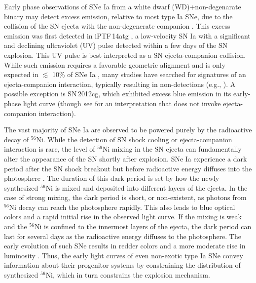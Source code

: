 \documentclass[twocolumn]{aastex61}
\newcommand{\ycao}[1]{{\color{red} ycao: {#1}}}
\begin{document}
Early phase observations of SNe Ia from a white dwarf (WD)$+$non-degenarate binary
may detect excess emission, relative to most type Ia SNe, due to the 
collision of the SN ejecta with the non-degenerate companion 
\citep{1973ApJ...186.1007W,2010ApJ...708.1025K}. This excess 
emission was first detected in iPTF\,14atg  \citep{2015Natur.521..328C}, a low-velocity SN Ia with a significant and declining ultraviolet (UV) pulse detected within a
few days of the SN explosion. This UV pulse is best interpreted as a
SN ejecta-companion collision. While such emission requires a 
favorable geometric alignment and is only expected in $\lesssim$ 
10\% of SNe Ia \citep{2010ApJ...708.1025K}, many studies have 
searched for signatures of an ejecta-companion interaction, 
typically resulting in non-detections 
(e.g., \citealt{2010ApJ...722.1691H,2011ApJ...741...20B,2012ApJ...744...38F,
  2012ApJ...744L..17B,2015Natur.521..332O,
  2013ApJ...778L..15Z,2015ApJ...799..106G,2016ApJ...826..144S,
  2015ApJS..221...22I}). A possible exception is SN\,2012cg, 
which exhibited excess blue emission in its early-phase light curve 
\citet{2016ApJ...820...92M} (though see 
\citealt{2016arXiv161007601S} for an interpretation that does not 
invoke ejecta-companion interaction). 

The vast majority of SNe Ia are observed 
to be powered purely by the radioactive decay of $^{56}$Ni. 
While the detection of SN shock cooling or ejecta-companion interaction is rare, the level of $^{56}$Ni mixing in the SN ejecta can fundamentally alter the appearance of the SN shortly after explosion. SNe Ia experience a dark period after
the SN shock breakout but before radioactive energy  
diffuses into the photosphere \citep{2014ApJ...784...85P}. The 
duration of this dark period is set by how the newly synthesized 
$^{56}$Ni is mixed and deposited into different layers of the ejecta.
In the case of strong mixing, the dark period is short, or 
non-existent, as photons from $^{56}$Ni decay can reach the 
photosphere rapidly. This also leads to blue optical colors and a 
rapid initial rise in the observed light curve. If the mixing is 
weak and the $^{56}$Ni is confined to the innermost layers of the 
ejecta, the dark period can last for several days as the radioactive 
energy diffuses to the photosphere. The early evolution of such SNe 
results in redder colors and a more moderate rise in luminosity 
\citep{2016ApJ...826...96P}. Thus, the early light curves of even non-exotic type Ia SNe convey information about their progenitor systems by constraining the distribution of synthesized $^{56}$Ni, which in turn constrains the explosion mechanism.
\end{document}
